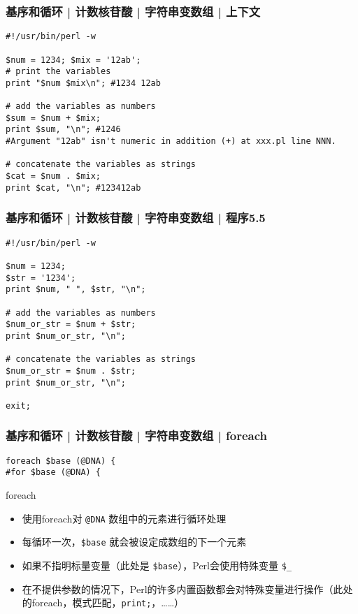 \begin{frame}[fragile]
  \frametitle{基序和循环 | 计数核苷酸 | 字符串变数组 | 上下文}
\begin{lstlisting}
#!/usr/bin/perl -w

$num = 1234; $mix = '12ab';
# print the variables
print "$num $mix\n"; #1234 12ab

# add the variables as numbers
$sum = $num + $mix;
print $sum, "\n"; #1246
#Argument "12ab" isn't numeric in addition (+) at xxx.pl line NNN.

# concatenate the variables as strings
$cat = $num . $mix;
print $cat, "\n"; #123412ab
\end{lstlisting}
\end{frame}

\begin{frame}[fragile]
  \frametitle{基序和循环 | 计数核苷酸 | 字符串变数组 | \alert{程序5.5}}
\begin{lstlisting}
#!/usr/bin/perl -w

$num = 1234;
$str = '1234';
print $num, " ", $str, "\n";

# add the variables as numbers
$num_or_str = $num + $str;
print $num_or_str, "\n";

# concatenate the variables as strings
$num_or_str = $num . $str;
print $num_or_str, "\n";

exit;
\end{lstlisting}
\end{frame}


\begin{frame}[fragile]
  \frametitle{基序和循环 | 计数核苷酸 | 字符串变数组 | \alert{foreach}}
\begin{lstlisting}
foreach $base (@DNA) {
#for $base (@DNA) {
\end{lstlisting}
\pause
\begin{block}{foreach}
  \begin{itemize}
    \item 使用foreach对 \verb|@DNA| 数组中的元素进行循环处理
    \item 每循环一次，\verb|$base| 就会被设定成数组的下一个元素
    \item 如果不指明标量变量（此处是 \verb|$base|），Perl会使用特殊变量 \verb|$_|
    \item 在不提供参数的情况下，Perl的许多内置函数都会对特殊变量进行操作（此处的foreach，模式匹配，\verb|print;|，……）
  \end{itemize}
\end{block}
\end{frame}

